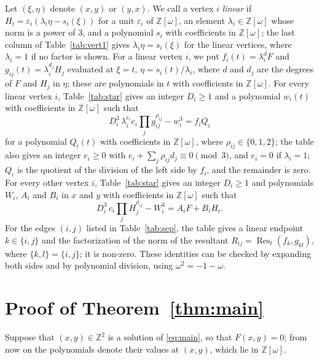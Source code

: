 \documentclass[11pt]{article}
\newcommand{\Z}{\mathbb{Z}}
\begin{document}
Let $(\xi,\eta)$ denote $(x,y)$ or $(y,x)$. We call a vertex $i$ \emph{linear} if $H_i=\varepsilon_i(\lambda_i\eta-s_i(\xi))$ for a unit $\varepsilon_i$ of $\Z[\omega]$, an element $\lambda_i\in\Z[\omega]$ whose norm is a power of $3$, and a polynomial $s_i$ with coefficients in $\Z[\omega]$; the last column of Table~\ref{tab:vert1} gives $\lambda_i\eta=s_i(\xi)$ for the linear vertices, where $\lambda_i=1$ if no factor is shown. For a linear vertex $i$, we put $f_i(t)=\lambda_i^{d}F$ and $g_{ij}(t)=\lambda_i^{d_j}H_j$ evaluated at $\xi=t$, $\eta=s_i(t)/\lambda_i$, where $d$ and $d_j$ are the degrees of $F$ and $H_j$ in $\eta$; these are polynomials in $t$ with coefficients in $\Z[\omega]$.
For every linear vertex $i$, Table~\ref{tab:star} gives an integer $D_i\geq1$ and a polynomial $w_i(t)$ with coefficients in $\Z[\omega]$ such that
\begin{equation}\label{eq:starlin}
D_i^3\,\lambda_i^{e_i}c_i\prod_jg_{ij}^{\rho_{ij}}-w_i^3=f_iQ_i
\end{equation}
for a polynomial $Q_i(t)$ with coefficients in $\Z[\omega]$, where $\rho_{ij}\in\{0,1,2\}$; the table also gives an integer $e_i\geq0$ with $e_i+\sum_j\rho_{ij}d_j\equiv0\pmod3$, and $e_i=0$ if $\lambda_i=1$; $Q_i$ is the quotient of the division of the left side by $f_i$, and the remainder is zero.
For every other vertex $i$, Table~\ref{tab:star} gives an integer $D_i\geq1$ and polynomials $W_i$, $A_i$ and $B_i$ in $x$ and $y$ with coefficients in $\Z[\omega]$ such that
\begin{equation}\label{eq:star}
D_i^3\,c_i\prod_jH_j^{\rho_{ij}}-W_i^3=A_iF+B_iH_i.
\end{equation}
For the edges $(i,j)$ listed in Table~\ref{tab:sep}, the table gives a linear endpoint $k\in\{i,j\}$ and the factorization of the norm of the resultant $R_{ij}=\operatorname{Res}_t(f_k,g_{kl})$, where $\{k,l\}=\{i,j\}$; it is non-zero.
These identities can be checked by expanding both sides and by polynomial division, using $\omega^2=-1-\omega$.

\section{Proof of Theorem~\ref{thm:main}}

Suppose that $(x,y)\in\Z^2$ is a solution of \eqref{eq:main}, so that $F(x,y)=0$; from now on the polynomials denote their values at $(x,y)$, which lie in $\Z[\omega]$.
\end{document}
